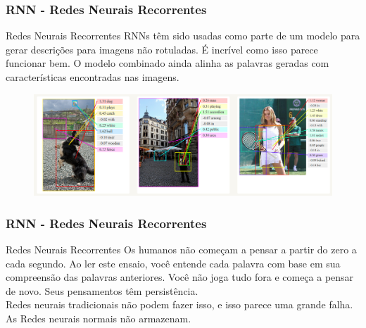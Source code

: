 \documentclass{beamer}
\begin{document}
\begin{frame}
	\frametitle{RNN - Redes Neurais Recorrentes}
	\begin{block}{Redes Neurais Recorrentes}
		RNNs têm sido usadas como parte de um modelo para gerar descrições para imagens não rotuladas. É incrível como isso parece funcionar bem. O modelo combinado ainda alinha as palavras geradas com características encontradas nas imagens.
		\begin{figure}
			\centering
			\includegraphics[width=1\linewidth]{figures/rnn_img_text}
		\end{figure}
		
	\end{block}
\end{frame}
\begin{frame}
	\frametitle{RNN - Redes Neurais Recorrentes}
	\begin{block}{Redes Neurais Recorrentes}
		Os humanos não começam a pensar a partir do zero a cada segundo. Ao ler este ensaio, você entende cada palavra com base em sua compreensão das palavras anteriores. Você não joga tudo fora e começa a pensar de novo. Seus pensamentos têm persistência. \\ 
		Redes neurais tradicionais não podem fazer isso, e isso parece uma grande falha. \alert{As Redes neurais normais não armazenam}.
	\end{block}
\end{frame}
\end{document}

